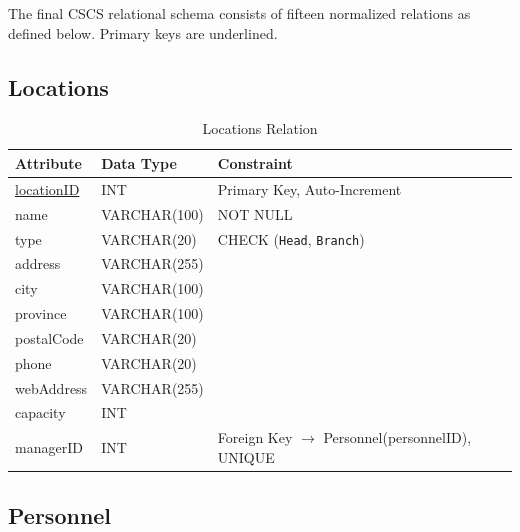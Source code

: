 \documentclass[11pt,a4paper]{article}
\begin{document}
The final CSCS relational schema consists of fifteen normalized relations as defined below. Primary keys are underlined.


\subsection{Locations}

\begin{table}[H]
\centering
\begin{tabular}{lll}
\toprule
Attribute & Data Type & Constraint \\
\midrule
\underline{locationID} & INT & Primary Key, Auto-Increment \\
name & VARCHAR(100) & NOT NULL \\
type & VARCHAR(20) & CHECK (\texttt{Head}, \texttt{Branch}) \\
address & VARCHAR(255) & \\
city & VARCHAR(100) & \\
province & VARCHAR(100) & \\
postalCode & VARCHAR(20) & \\
phone & VARCHAR(20) & \\
webAddress & VARCHAR(255) & \\
capacity & INT & \\
managerID & INT & Foreign Key $\rightarrow$ Personnel(personnelID), UNIQUE \\
\bottomrule
\end{tabular}
\caption{Locations Relation}
\end{table}


\subsection{Personnel}
\end{document}
